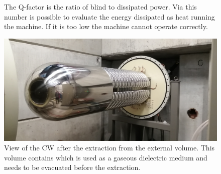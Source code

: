 \begin{refsection}
        \begin{figure}[ht]   
            \centering
            \hfill
            \caption{The Q-factor is the ratio of blind to dissipated power. Via this number is possible to evaluate the energy dissipated as heat running the machine. If it is too low the machine cannot operate correctly.}
        \end{figure}

        \begin{figure}
            \centering
            \includegraphics[width=1\textwidth]{Figures/MEG/CW/view_front.jpg}
            \caption{View of the CW after the extraction from the external volume. This volume contains  which is used as a gaseous dielectric medium and needs to be evacuated before the extraction.}
            \label{fig:CW:view}
        \end{figure}


\end{refsection}
